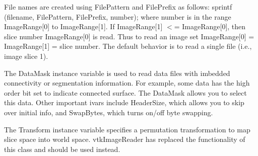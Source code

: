 File names are created using File\-Pattern and File\-Prefix as follows\-: sprintf (filename, File\-Pattern, File\-Prefix, number); where number is in the range Image\-Range\mbox{[}0\mbox{]} to Image\-Range\mbox{[}1\mbox{]}. If Image\-Range\mbox{[}1\mbox{]} $<$= Image\-Range\mbox{[}0\mbox{]}, then slice number Image\-Range\mbox{[}0\mbox{]} is read. Thus to read an image set Image\-Range\mbox{[}0\mbox{]} = Image\-Range\mbox{[}1\mbox{]} = slice number. The default behavior is to read a single file (i.\-e., image slice 1).

The Data\-Mask instance variable is used to read data files with imbedded connectivity or segmentation information. For example, some data has the high order bit set to indicate connected surface. The Data\-Mask allows you to select this data. Other important ivars include Header\-Size, which allows you to skip over initial info, and Swap\-Bytes, which turns on/off byte swapping.

The Transform instance variable specifies a permutation transformation to map slice space into world space. vtk\-Image\-Reader has replaced the functionality of this class and should be used instead.

